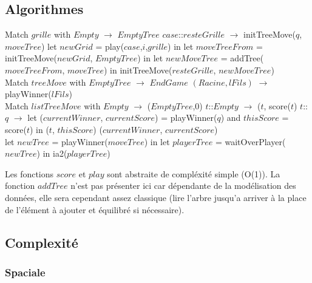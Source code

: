 \documentclass[a4paper,12pt]{report}
\begin{document}
\subsection{Algorithmes}

\begin{algorithmic}
	\State Match $grille$ with
	\State $Empty$ $\rightarrow$ $EmptyTree$
	\State $case$::$resteGrille$ $\rightarrow$
			initTreeMove($q$, $moveTree$)
		\Else
				\State let $newGrid$ = play($case$,$i$,$grille$) in
				\State let $moveTreeFrom$ = initTreeMove($newGrid$, $EmptyTree$) in
				\State let $newMoveTree$ = addTree($moveTreeFrom$, $moveTree$) in
				\State initTreeMove($resteGrille$, $newMoveTree$)
			\EndFor
		\EndIf
\EndFunction
\\
	\State Match $treeMove$ with
	\State $EmptyTree$ $\rightarrow$ $EndGame$
	\State $(Racine, lFils)$ $\rightarrow$ playWinner($lFils$)
\EndFunction
\\
	\State Match $listTreeMove$ with
	\State $Empty$ $\rightarrow$ ($EmptyTree$,0)
	\State $t$::$Empty$ $\rightarrow$ ($t$, score($t$)
	\State $t$::$q$ $\rightarrow$ let ($currentWinner$, $currentScore$) = playWinner($q$) and $thisScore$ = score($t$) in
			\State ($t$, $thisScore$)
		\Else
			\State ($currentWinner$, $currentScore$)
		\EndIf
\EndFunction
\\
	\State let $newTree$ = playWinner($moveTree$) in
	\State let $playerTree$ = waitOverPlayer($newTree$) in
	\State ia2($playerTree$)
\EndFunction
\end{algorithmic}
Les fonctions $score$ et $play$ sont abstraite de compl\'exit\'e simple (O(1)). La fonction $addTree$ n'est pas pr\'esenter ici car d\'ependante de la mod\'elisation des donn\'ees, elle sera cependant assez classique (lire l'arbre jusqu'a arriver \`a la place de l'\'el\'ement \`a ajouter et \'equilibr\'e si n\'ecessaire).

\subsection{Complexit\'e}

\subsubsection{Spaciale}
\end{document}
